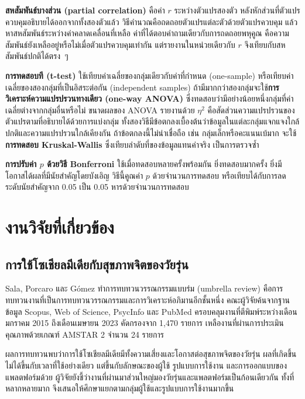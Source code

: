 \textbf{สหสัมพันธ์บางส่วน (partial correlation)} คือค่า $r$ ระหว่างตัวแปรสองตัว
หลังหักส่วนที่ตัวแปรควบคุมอธิบายได้ออกจากทั้งสองตัวแล้ว
วิธีคำนวณคือถดถอยตัวแปรแต่ละตัวด้วยตัวแปรควบคุม แล้วหาสหสัมพันธ์ระหว่างค่าคลาดเคลื่อนที่เหลือ
ค่าที่ได้ตอบคำถามเดียวกับการถดถอยพหุคูณ คือความสัมพันธ์ยังเหลืออยู่หรือไม่เมื่อตัวแปรควบคุมเท่ากัน
แต่รายงานในหน่วยเดียวกับ $r$ จึงเทียบกับสหสัมพันธ์ปกติได้ตรง~ๆ

\textbf{การทดสอบที (t-test)} ใช้เทียบค่าเฉลี่ยของกลุ่มเดียวกับค่าที่กำหนด (one-sample)
หรือเทียบค่าเฉลี่ยของสองกลุ่มที่เป็นอิสระต่อกัน (independent samples)
ถ้ามีมากกว่าสองกลุ่มจะใช้\textbf{การวิเคราะห์ความแปรปรวนทางเดียว (one-way ANOVA)}
ซึ่งทดสอบว่ามีอย่างน้อยหนึ่งกลุ่มที่ค่าเฉลี่ยต่างจากกลุ่มอื่นหรือไม่
ขนาดผลของ ANOVA รายงานด้วย $\eta^2$ คือสัดส่วนความแปรปรวนของตัวแปรตามที่อธิบายได้ด้วยการแบ่งกลุ่ม
ทั้งสองวิธีมีข้อตกลงเบื้องต้นว่าข้อมูลในแต่ละกลุ่มแจกแจงใกล้ปกติและความแปรปรวนใกล้เคียงกัน
ถ้าข้อตกลงนี้ไม่น่าเชื่อถือ เช่น กลุ่มเล็กหรือคะแนนเบ้มาก
จะใช้\textbf{การทดสอบ Kruskal-Wallis} ซึ่งเทียบลำดับที่ของข้อมูลแทนค่าจริง เป็นการตรวจซ้ำ

\textbf{การปรับค่า $p$ ด้วยวิธี Bonferroni} ใช้เมื่อทดสอบหลายครั้งพร้อมกัน
ยิ่งทดสอบมากครั้ง ยิ่งมีโอกาสได้ผลที่มีนัยสำคัญโดยบังเอิญ
วิธีนี้คูณค่า $p$ ด้วยจำนวนการทดสอบ หรือเทียบได้กับการลดระดับนัยสำคัญจาก 0.05 เป็น 0.05 หารด้วยจำนวนการทดสอบ

\section{งานวิจัยที่เกี่ยวข้อง}

\subsection{การใช้โซเชียลมีเดียกับสุขภาพจิตของวัยรุ่น}

Sala, Porcaro และ Gómez \cite{sala2024umbrella} ทำการทบทวนวรรณกรรมแบบร่ม (umbrella review)
คือการทบทวนงานที่เป็นการทบทวนวรรณกรรมและการวิเคราะห์อภิมานอีกชั้นหนึ่ง
คณะผู้วิจัยค้นจากฐานข้อมูล Scopus, Web of Science, PsycInfo และ PubMed
ครอบคลุมงานที่ตีพิมพ์ระหว่างเดือนมกราคม 2015 ถึงเดือนเมษายน 2023
คัดกรองจาก 1,470 รายการ เหลืองานที่ผ่านการประเมินคุณภาพด้วยเกณฑ์ AMSTAR 2 จำนวน 24 รายการ

ผลการทบทวนพบว่าการใช้โซเชียลมีเดียมีทั้งความเสี่ยงและโอกาสต่อสุขภาพจิตของวัยรุ่น
ผลที่เกิดขึ้นไม่ได้ขึ้นกับเวลาที่ใช้อย่างเดียว
แต่ขึ้นกับลักษณะของผู้ใช้ รูปแบบการใช้งาน และการออกแบบของแพลตฟอร์มด้วย
ผู้วิจัยยังชี้ว่างานที่ผ่านมาส่วนใหญ่มองวัยรุ่นและแพลตฟอร์มเป็นก้อนเดียวกัน
ทั้งที่หลากหลายมาก จึงเสนอให้ศึกษาแยกตามกลุ่มผู้ใช้และรูปแบบการใช้งานมากขึ้น

